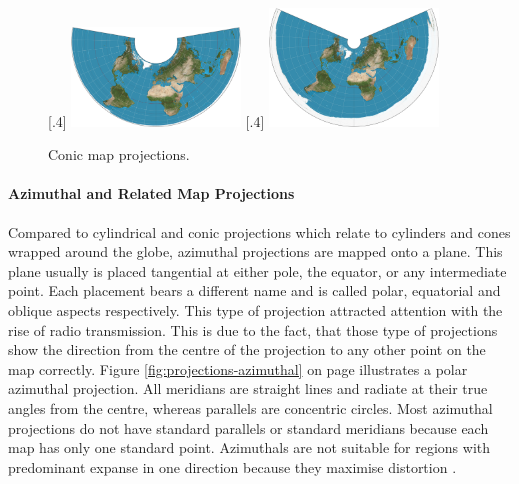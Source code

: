 \begin{figure}[!htb]
    \centering
  [.4\linewidth]
    {
        \includegraphics[width=0.4\textwidth,keepaspectratio]
        {images/methods/projections/albers.jpg}
    }
    \qquad
    [.4\linewidth]
    {
        \includegraphics[width=0.4\textwidth,keepaspectratio]
        {images/methods/projections/equidistant.jpg}
    }

    \caption{Conic map projections.}
\end{figure}

\paragraph{Azimuthal and Related Map Projections}
Compared to cylindrical and conic projections which relate to cylinders and cones wrapped around the globe, azimuthal projections are mapped onto a plane. This plane usually is placed tangential at either pole, the equator, or any intermediate point. Each placement bears a different name and is called polar, equatorial and oblique aspects respectively. This type of projection attracted attention with the rise of radio transmission. This is due to the fact, that those type of projections show the direction from the centre of the projection to any other point on the map correctly. Figure \ref{fig:projections-azimuthal} on page \pageref{fig:projections-azimuthal} illustrates a polar azimuthal projection. All meridians are straight lines and radiate at their true angles from the centre, whereas parallels are concentric circles. Most azimuthal projections do not have standard parallels or standard meridians because each map has only one standard point. Azimuthals are not suitable for regions with predominant expanse in one direction because they maximise distortion .

